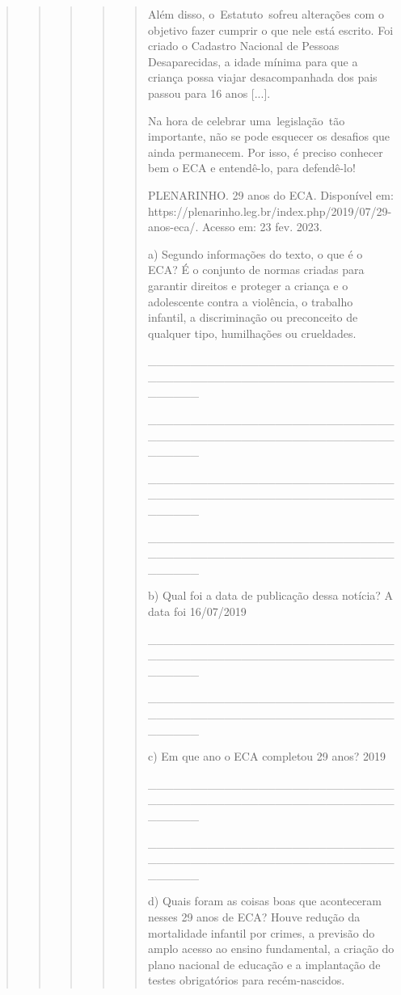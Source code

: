\begin{quote}
\begin{quote}
\begin{quote}
\begin{quote}
\begin{quote}
\protect\hypertarget{_Hlk128033654}{}{}Além disso, o~Estatuto~sofreu
alterações com o objetivo fazer cumprir o que nele está escrito. Foi
criado o Cadastro Nacional de Pessoas Desaparecidas, a idade mínima para
que a criança possa viajar desacompanhada dos pais passou para 16 anos
{[}...{]}.

Na hora de celebrar uma~legislação~tão importante, não se pode esquecer
os desafios que ainda permanecem. Por isso, é preciso conhecer bem o ECA
e entendê-lo, para defendê-lo!

PLENARINHO. 29 anos do ECA. Disponível em:
https://plenarinho.leg.br/index.php/2019/07/29-anos-eca/. Acesso em: 23
fev. 2023.

a) Segundo informações do texto, o que é o ECA? É o conjunto de normas
criadas para garantir direitos e proteger a criança e o adolescente
contra a violência, o trabalho infantil, a discriminação ou preconceito
de qualquer tipo, humilhações ou crueldades.

\_\_\_\_\_\_\_\_\_\_\_\_\_\_\_\_\_\_\_\_\_\_\_\_\_\_\_\_\_\_\_\_\_\_\_\_\_\_\_\_\_\_\_\_\_\_\_\_\_\_\_\_\_\_\_\_\_\_\_\_\_\_\_\_

\_\_\_\_\_\_\_\_\_\_\_\_\_\_\_\_\_\_\_\_\_\_\_\_\_\_\_\_\_\_\_\_\_\_\_\_\_\_\_\_\_\_\_\_\_\_\_\_\_\_\_\_\_\_\_\_\_\_\_\_\_\_\_\_

\_\_\_\_\_\_\_\_\_\_\_\_\_\_\_\_\_\_\_\_\_\_\_\_\_\_\_\_\_\_\_\_\_\_\_\_\_\_\_\_\_\_\_\_\_\_\_\_\_\_\_\_\_\_\_\_\_\_\_\_\_\_\_\_

\_\_\_\_\_\_\_\_\_\_\_\_\_\_\_\_\_\_\_\_\_\_\_\_\_\_\_\_\_\_\_\_\_\_\_\_\_\_\_\_\_\_\_\_\_\_\_\_\_\_\_\_\_\_\_\_\_\_\_\_\_\_\_\_

b) Qual foi a data de publicação dessa notícia? A data foi 16/07/2019~

\_\_\_\_\_\_\_\_\_\_\_\_\_\_\_\_\_\_\_\_\_\_\_\_\_\_\_\_\_\_\_\_\_\_\_\_\_\_\_\_\_\_\_\_\_\_\_\_\_\_\_\_\_\_\_\_\_\_\_\_\_\_\_\_

\_\_\_\_\_\_\_\_\_\_\_\_\_\_\_\_\_\_\_\_\_\_\_\_\_\_\_\_\_\_\_\_\_\_\_\_\_\_\_\_\_\_\_\_\_\_\_\_\_\_\_\_\_\_\_\_\_\_\_\_\_\_\_\_

c) Em que ano o ECA completou 29 anos? 2019

\_\_\_\_\_\_\_\_\_\_\_\_\_\_\_\_\_\_\_\_\_\_\_\_\_\_\_\_\_\_\_\_\_\_\_\_\_\_\_\_\_\_\_\_\_\_\_\_\_\_\_\_\_\_\_\_\_\_\_\_\_\_\_\_

\_\_\_\_\_\_\_\_\_\_\_\_\_\_\_\_\_\_\_\_\_\_\_\_\_\_\_\_\_\_\_\_\_\_\_\_\_\_\_\_\_\_\_\_\_\_\_\_\_\_\_\_\_\_\_\_\_\_\_\_\_\_\_\_

d) Quais foram as coisas boas que aconteceram nesses 29 anos de ECA?
Houve redução da mortalidade infantil por crimes, a previsão do amplo
acesso ao ensino fundamental, a criação do plano nacional de educação e
a implantação de testes obrigatórios para recém-nascidos.


\end{quote}
\end{quote}
\end{quote}
\end{quote}
\end{quote}
